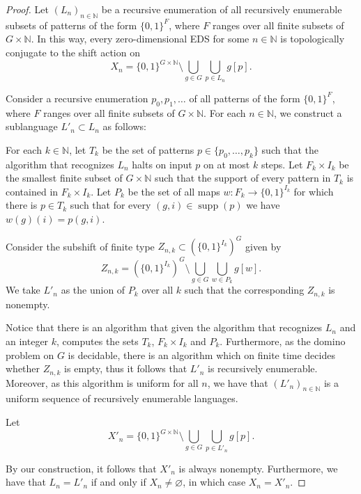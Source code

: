 \documentclass[10pt,a4paper]{amsart}
\newcommand{\NN}{\mathbb{N}}
\begin{document}
\begin{proof}

    Let $(L_n)_{n \in \NN}$ be a recursive enumeration of all recursively enumerable subsets of patterns of the form $\{0,1\}^F$, where $F$ ranges over all finite subsets of $G \times \NN$. In this way, every zero-dimensional EDS for some $n \in \NN$ is topologically conjugate to the shift action on \[ X_n = \{0,1\}^{G\times \NN}\setminus \bigcup_{g \in G}\bigcup_{p \in L_n}g[p].   \]
    

    Consider a recursive enumeration $p_0,p_1,\dots$ of all patterns of the form $\{0,1\}^F$, where $F$ ranges over all finite subsets of $G \times \NN$. For each $n \in \NN$, we construct a sublanguage $L'_n \subset L_n$ as follows:

    For each $k \in \NN$, let $T_k$ be the set of patterns $p\in \{p_0,\dots,p_k\}$ such that the algorithm that recognizes $L_n$ halts on input $p$ on at most $k$ steps. Let $F_k\times I_k$ be the smallest finite subset of $G\times \NN$ such that the support of every pattern in $T_k$ is contained in $F_k\times I_k$. Let $P_k$ be the set of all maps $w\colon F_k \to \{0,1\}^{I_k}$ for which there is $p \in T_k$ such that for every $(g,i)\in \operatorname{supp}(p)$ we have $w(g)(i)=p(g,i)$.

    Consider the subshift of finite type $Z_{n,k} \subset (\{0,1\}^{I_k})^G$ given by \[ Z_{n,k} = (\{0,1\}^{I_k})^G\setminus \bigcup_{g \in G}\bigcup_{w \in P_k}g[w].  \]
    We take $L'_n$ as the union of $P_k$ over all $k$ such that the corresponding $Z_{n,k}$ is nonempty.

    Notice that there is an algorithm that given the algorithm that recognizes $L_n$ and an integer $k$, computes the sets $T_k$, $F_k \times I_k$ and $P_k$. Furthermore, as the domino problem on $G$ is decidable, there is an algorithm which on finite time decides whether $Z_{n,k}$ is empty, thus it follows that $L'_n$ is recursively enumerable. Moreover, as this algorithm is uniform for all $n$, we have that $(L'_n)_{n \in \NN}$ is a uniform sequence of recursively enumerable languages.
    
    Let \[ X'_n = \{0,1\}^{G\times \NN}\setminus \bigcup_{g \in G}\bigcup_{p \in L'_n}g[p].   \]

    By our construction, it follows that $X'_n$ is always nonempty. Furthermore, we have that $L_n = L'_n$ if and only if $X_n \neq \varnothing$, in which case $X_n = X'_n$.


\end{proof}
\end{document}
